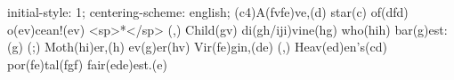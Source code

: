 initial-style: 1;
centering-scheme: english;
(c4)A(fvfe)ve,(d) star(c) of(dfd) o(ev)cean!(ev) <sp>*</sp> (,)
Child(gv) di(gh/iji)vine(hg) who(hih) bar(g)est:(g) (;)
Moth(hi)er,(h) ev(g)er(hv) Vir(fe)gin,(de) (,)
Heav(ed)en's(cd) por(fe)tal(fgf) fair(ede)est.(e)
